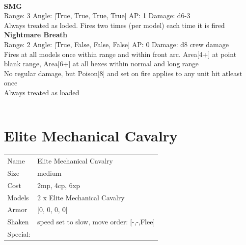 {\ \\
{\bf SMG } \\



Range: 3  Angle: [True, True, True, True] AP: 1 Damage: d6-3 \\
Always treated as loded. Fires two times (per model) each time it is fired\\ 




{\bf Nightmare Breath } \\



Range: 2  Angle: [True, False, False, False] AP: 0 Damage: d8 crew damage \\
Fires at all models once within range and within front arc. Area[4+] at point blank range, Area[6+] at all hexes within normal and long range\\ 
No regular damage, but Poison[8] and set on fire applies to any unit hit atleast once\\ 
Always treated as loaded\\ 




 
\ \\













\clearpage

\section{ Elite Mechanical Cavalry }

\begin{tabular}{ll}
  Name & Elite Mechanical Cavalry \\
  Size & medium\\
  Cost & 2mp, 4cp, 6xp\\
  Models & 2 x Elite Mechanical Cavalry\\
  Armor & [0, 0, 0, 0]\\
  Shaken & speed set to slow, move order: [-,-,Flee]\\
  Special: \\
\end{tabular}

\noindent 

}
